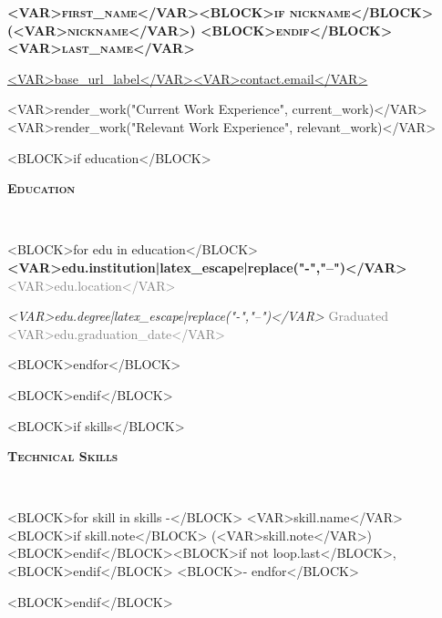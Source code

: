 \documentclass[12pt]{article}
\begin{document}
\noindent
\centering

\begin{LARGE}

	\textsc{\textbf{<VAR>first_name</VAR><BLOCK>if nickname</BLOCK>
			(<VAR>nickname</VAR>) <BLOCK>endif</BLOCK><VAR>last_name</VAR>}}

\end{LARGE}

\vspace{1mm}

\begin{small}
	\qquad
	\href{<VAR>base_url</VAR>}{<VAR>base_url_label</VAR>}\qquad\textbar\qquad\href{mailto:<VAR>contact.email</VAR>}{<VAR>contact.email</VAR>}\qquad\textbar{}\ \qquad
\end{small}

\raggedright

\vspace{1mm}

<VAR>render_work("Current Work Experience", current_work)</VAR>
<VAR>render_work("Relevant Work Experience", relevant_work)</VAR>

<BLOCK>if education</BLOCK>
\hrulefill

\begin{large}
	\textsc{\textbf{Education}}
	\vspace{-3mm}
\end{large}

\textcolor{lightgray}{\hrulefill}\\

\begin{small}
	<BLOCK>for edu in education</BLOCK>
	\textbf{<VAR>edu.institution|latex_escape|replace("-","--")</VAR>} \hfill
	\textcolor{gray}{<VAR>edu.location</VAR>}

	\textit{<VAR>edu.degree|latex_escape|replace("-","--")</VAR>} \hfill
	\textcolor{gray}{Graduated <VAR>edu.graduation_date</VAR>}

	\vspace{1mm}
	<BLOCK>endfor</BLOCK>
	\vspace{-2mm}
\end{small}
<BLOCK>endif</BLOCK>

<BLOCK>if skills</BLOCK>
\hrulefill

\begin{large}
	\textsc{\textbf{Technical Skills}}
	\vspace{-3mm}
\end{large}

\textcolor{lightgray}{\hrulefill}\\

\begin{small}
	<BLOCK>for skill in skills -</BLOCK>
	<VAR>skill.name</VAR><BLOCK>if skill.note</BLOCK> (<VAR>skill.note</VAR>)<BLOCK>endif</BLOCK><BLOCK>if not loop.last</BLOCK>, <BLOCK>endif</BLOCK>
	<BLOCK>- endfor</BLOCK>
\end{small}

<BLOCK>endif</BLOCK>
\end{document}
